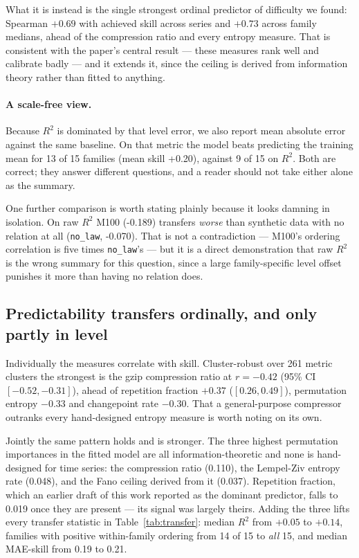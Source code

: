 \documentclass[11pt,a4paper]{article}
\newcommand{\num}[1]{#1}
\begin{document}
What it is instead is the single strongest ordinal predictor of difficulty we
found: Spearman \(+0.69\) with achieved skill across series and \(+0.73\)
across family medians, ahead of the compression ratio and every entropy measure.
That is consistent with the paper's central result --- these measures rank well
and calibrate badly --- and it extends it, since the ceiling is derived from
information theory rather than fitted to anything.

\paragraph{A scale-free view.} Because \(R^2\) is dominated by that level
error, we also report mean absolute error against the same baseline. On that
metric the model beats predicting the training mean for \num{13} of \num{15}
families (mean skill \num{+0.20}), against \num{9} of \num{15} on \(R^2\).
Both are correct; they answer different questions, and a reader should not take
either alone as the summary.

One further comparison is worth stating plainly because it looks damning in
isolation. On raw \(R^2\) M100 (\num{-0.189}) transfers \emph{worse} than
synthetic data with no relation at all (\texttt{no\_law}, \num{-0.070}). That
is not a contradiction --- M100's ordering correlation is five times
\texttt{no\_law}'s --- but it is a direct demonstration that raw \(R^2\) is the
wrong summary for this question, since a large family-specific level offset
punishes it more than having no relation does.

\subsection{Predictability transfers ordinally, and only partly in level}
\label{sec:linking}

Individually the measures correlate with skill. Cluster-robust over \num{261}
metric clusters the strongest is the gzip compression ratio at \(r=-0.42\)
(95\% CI \([-0.52,-0.31]\)), ahead of repetition fraction \(+0.37\)
(\([0.26,0.49]\)), permutation entropy \(-0.33\) and changepoint rate
\(-0.30\). That a general-purpose compressor outranks every hand-designed
entropy measure is worth noting on its own.

Jointly the same pattern holds and is stronger. The three highest permutation
importances in the fitted model are all information-theoretic and none is
hand-designed for time series: the compression ratio (\num{0.110}), the
Lempel-Ziv entropy rate (\num{0.048}), and the Fano ceiling derived from it
(\num{0.037}). Repetition fraction, which an earlier draft of this work reported
as the dominant predictor, falls to \num{0.019} once they are present --- its
signal was largely theirs. Adding the three lifts every transfer statistic in
Table~\ref{tab:transfer}: median \(R^2\) from \(+0.05\) to \(+0.14\), families
with positive within-family ordering from \num{14} of \num{15} to \emph{all}
\num{15}, and median MAE-skill from \num{0.19} to \num{0.21}.
\end{document}
